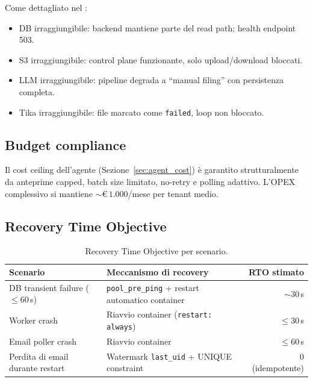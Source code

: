 Come dettagliato nel :
\begin{itemize}[leftmargin=*]
    \item DB irraggiungibile: backend mantiene parte del read path; health endpoint 503.
    \item S3 irraggiungibile: control plane funzionante, solo upload/download bloccati.
    \item LLM irraggiungibile: pipeline degrada a ``manual filing'' con persistenza completa.
    \item Tika irraggiungibile: file marcato come \texttt{failed}, loop non bloccato.
\end{itemize}

\subsection{Budget compliance}

Il cost ceiling dell'agente (Sezione~\ref{sec:agent_cost}) \`e garantito strutturalmente
da anteprime capped, batch size limitato, no-retry e polling adattivo. L'OPEX complessivo
si mantiene $\sim$\euro$\,1.000$/mese per tenant medio.

\subsection{Recovery Time Objective}

\begin{table}[ht]
\centering
\small
\begin{tabularx}{\linewidth}{l X r}
\toprule
\textbf{Scenario} & \textbf{Meccanismo di recovery} & \textbf{RTO stimato} \\
\midrule
DB transient failure ($\leq 60$\,s) & \texttt{pool\_pre\_ping} + restart automatico container & $\sim 30$\,s \\
Worker crash                         & Riavvio container (\texttt{restart: always})            & $\leq 30$\,s \\
Email poller crash                   & Riavvio container                                      & $\leq 60$\,s \\
Perdita di email durante restart     & Watermark \texttt{last\_uid} + UNIQUE constraint       & 0 (idempotente) \\
\bottomrule
\end{tabularx}
\caption{Recovery Time Objective per scenario.}
\label{tab:rto}
\end{table}

